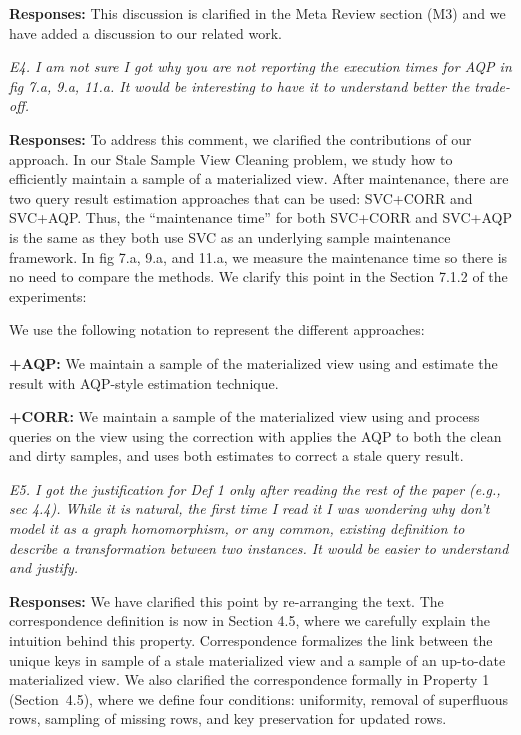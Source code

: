 \vspace{.25em}

{\bf Responses:} This discussion is clarified in the Meta Review section (M3) and we have added a discussion to our related work.

\vspace{1em}
\emph{E4. I am not sure I got why you are not reporting the execution times for AQP in fig 7.a, 9.a, 11.a. It would be interesting to have it to understand better the trade-off.}

\vspace{.25em}

{\bf Responses:} To address this comment, we clarified the contributions of our approach. In our Stale Sample View Cleaning problem, we study how to efficiently maintain a sample of a materialized view. After maintenance, there are two query result estimation approaches that can be used: SVC+CORR and SVC+AQP. Thus, the “maintenance time” for both SVC+CORR and SVC+AQP is the same as they both use SVC as an underlying sample maintenance framework.  In fig 7.a, 9.a, and 11.a, we measure the maintenance time so there is no need to compare the methods. We clarify this point in the Section 7.1.2 of the experiments:

\vspace{.5em}
We use the following notation to represent the different approaches:
\begin{displayquote}
\noindent\textbf{\svcnospace+AQP: } We maintain a sample of the materialized view using \svc and estimate the result with AQP-style estimation technique. 

\noindent\textbf{\svcnospace+CORR: } We maintain a sample of the materialized view using \svc and process queries on the view using the correction with applies the AQP to both the clean and dirty samples, and uses both estimates to correct a stale query result.
\end{displayquote}

\vspace{1em}
\emph{E5. I got the justification for Def 1 only after reading the rest of the paper (e.g., sec 4.4). While it is natural, the first time I read it I was wondering why don't model it as a graph homomorphism, or any common, existing definition to describe a transformation between two instances. It would be easier to understand and justify.}

\vspace{.25em}

{\bf Responses:} We have clarified this point by re-arranging the text. The correspondence definition is now in Section 4.5, where we carefully explain the intuition behind this property. Correspondence formalizes the link between the unique keys in sample of a stale materialized view and a sample of an up-to-date materialized view. 
We also clarified the correspondence formally in Property 1 (Section~4.5), where we define four conditions: uniformity, removal of superfluous rows, sampling of missing rows, and key preservation for updated rows.

